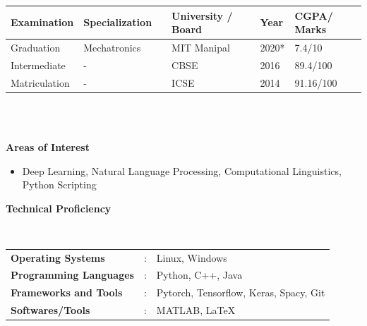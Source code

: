 \documentclass[a4paper,10pt]{article}
\begin{document}
\vspace{-.8cm}

\begin{tabularx}{.98\textwidth}{llp{2cm}lll}
    \hline
    \textbf{Examination} & \textbf{Specialization} & & \textbf{University / Board} & \textbf{Year} & \textbf{CGPA/ Marks}\\
    \hline
    Graduation & Mechatronics & & MIT Manipal & 2020* & 7.4/10\\
    Intermediate & - & & CBSE & 2016 & 89.4/100 \\
    Matriculation & - & & ICSE & 2014 & 91.16/100 \\
    \hline
\end{tabularx}
\\\\


\colorbox{titleColor}{\parbox{6.7in}{\textbf{Areas of Interest}}}
\begin{itemize}
  \setlength{\itemsep}{1pt}
  \item {{Deep Learning, Natural Language Processing, Computational Linguistics,
   Python Scripting}}
 \end{itemize} 

\colorbox{titleColor}{\parbox{6.7in}{\textbf{Technical Proficiency}}}\\

\begin{tabular}{p{1.6in}p{0.1in}p{4.5in}}
  \textbf{\small{Operating Systems}} &: &{{Linux, Windows}} \\
  \textbf{\small{Programming Languages}} &: &{{Python, C++, Java}} \\
  \textbf{\small{Frameworks and Tools}} &: &{{Pytorch, Tensorflow, Keras,  Spacy, Git}} \\
  \textbf{\small{Softwares/Tools}} &: &{{MATLAB, \LaTeX}} \\
\end{tabular}
\end{document}
